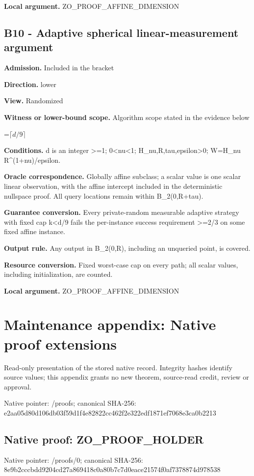 \documentclass[10pt,a4paper]{article}
\newcommand{\AtlasMath}[1]{\par\begingroup\centering\setbox0=\hbox{$\displaystyle #1$}\ifdim\wd0>1.4\linewidth\typeout{ATLAS WIDE FORMULA: \the\wd0}\fi\ifdim\wd0>\linewidth\resizebox{\linewidth}{!}{\box0}\else\box0\fi\par\endgroup}
\begin{document}
\textbf{Local argument.} ZO\_\allowbreak{}PROOF\_\allowbreak{}AFFINE\_\allowbreak{}DIMENSION

\subsection{B10 - Adaptive spherical linear-measurement argument}
\textbf{Admission.} Included in the bracket

\textbf{Direction.} lower

\textbf{View.} Randomized

\textbf{Witness or lower-bound scope.} Algorithm scope stated in the evidence below

\AtlasMath{\lceil d/9\rceil}
\textbf{Conditions.} d is an integer >=1; 0<nu<1; H\_\allowbreak{}nu,R,tau,epsilon>0; W=H\_\allowbreak{}nu R\textasciicircum{}(1+nu)/epsilon.

\textbf{Oracle correspondence.} Globally affine subclass; a scalar value is one scalar linear observation, with the affine intercept included in the deterministic nullspace proof. All query locations remain within B\_\allowbreak{}2(0,R+tau).

\textbf{Guarantee conversion.} Every private-random measurable adaptive strategy with fixed cap k<d/9 fails the per-instance success requirement >=2/3 on some fixed affine instance.

\textbf{Output rule.} Any output in B\_\allowbreak{}2(0,R), including an unqueried point, is covered.

\textbf{Resource conversion.} Fixed worst-case cap on every path; all scalar values, including initialization, are counted.

\textbf{Local argument.} ZO\_\allowbreak{}PROOF\_\allowbreak{}AFFINE\_\allowbreak{}DIMENSION

\section{Maintenance appendix: Native proof extensions}
Read-only presentation of the stored native record. Integrity hashes identify source values; this appendix grants no new theorem, source-read credit, review or approval.

Native pointer: /proofs; canonical SHA-256: e2aa05d80d106db03f59d1f4e82822cc462f2e322edf1871ef7068e3ca0b2213

\subsection{Native proof: ZO\_\allowbreak{}PROOF\_\allowbreak{}HOLDER}
Native pointer: /proofs/0; canonical SHA-256: 8e9b2cccbdd9204cd27a869418c0a80b7c7d0eace21574f0af7378874d978538
\end{document}
